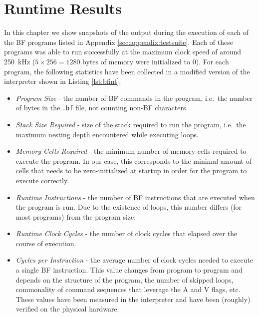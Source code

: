 \chapter{Runtime Results} \label{sec:results}
In this chapter we show snapshots of the output during the execution of each of the BF programs listed in Appendix \ref{sec:appendix:testsuite}. Each of these programs was able to run successfully at the maximum clock speed of around 250~kHz ($5\times256=1280$ bytes of memory were initialized to 0). For each program, the following statistics have been collected in a modified version of the interpreter shown in Listing \ref{lst:bfint}:

\begin{itemize}
\item \emph{Program Size} - the number of BF commands in the program, i.e.~the number of bytes in the \texttt{.bf} file, not counting non-BF characters.
\item \emph{Stack Size Required} - size of the stack required to run the program, i.e.~the maximum nesting depth encountered while executing loops.
\item \emph{Memory Cells Required} - the minimum number of memory cells required to execute the program. In our case, this corresponds to the minimal amount of cells that needs to be zero-initialized at startup in order for the program to execute correctly.
\item \emph{Runtime Instructions} - the number of BF instructions that are executed when the program is run. Due to the existence of loops, this number differs (for most programs) from the program size.
\item \emph{Runtime Clock Cycles} - the number of clock cycles that elapsed over the course of execution.
\item \emph{Cycles per Instruction} - the average number of clock cycles needed to execute a single BF instruction. This value changes from program to program and depends on the structure of the program, the number of skipped loops, commonality of command sequences that leverage the A and V flags, etc. These values have been measured in the interpreter and have been (roughly) verified on the physical hardware.
\end{itemize}


